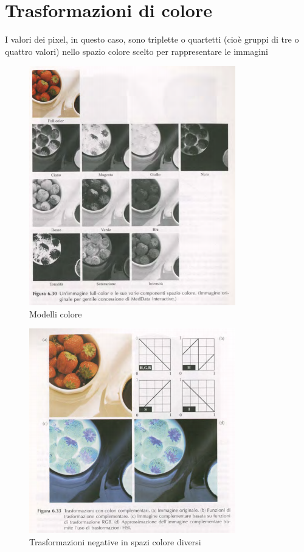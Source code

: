 \documentclass[12pt]{article}
\begin{document}
\section{Trasformazioni di colore}
I valori dei pixel, in questo caso, sono triplette o quartetti (cioè gruppi di tre o quattro valori) nello spazio colore scelto per rappresentare le immagini
\begin{figure}[!htb]
    \centering
    \includegraphics[width=0.8\textwidth]{Images/frag1.png}
    \caption{Modelli colore}
\end{figure}
\FloatBarrier
\begin{figure}[!htb]
    \centering
    \includegraphics[width=0.8\textwidth]{Images/trasfcolori.png}
    \caption{Trasformazioni negative in spazi colore diversi}
\end{figure}
\FloatBarrier
\end{document}
